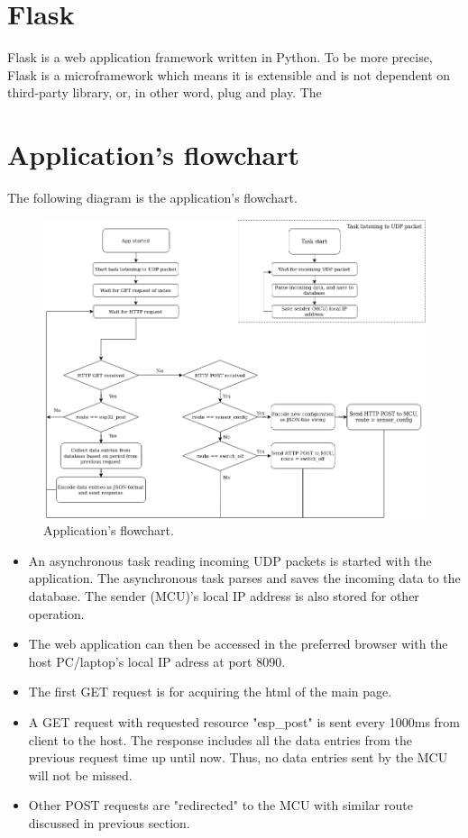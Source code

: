 \documentclass[../main.tex]{subfiles}
\begin{document}
    \section{Flask}    \label{sec:flask}
    Flask is a web application framework written in Python. To be more precise, Flask is a microframework which means it is extensible and is not dependent on third-party library, or, in other word, plug and play. The 

    \pagebreak
    \section{Application's flowchart} \label{sec:application_flowchart}
    The following diagram is the application's flowchart.
    \begin{figure}[!h]
        \centerline{\includegraphics[scale=0.5]{media/appliation_flowchart.drawio.png}}
        \caption{Application's flowchart.}
        \label{fig:application_flowchart}
    \end{figure}

    \justify
    \begin{itemize} 
        \item An asynchronous task reading incoming UDP packets is started with the application. The asynchronous task parses and saves the incoming data to the database. The sender (MCU)'s local IP address is also stored for other operation.
        \item The web application can then be accessed in the preferred browser with the host PC/laptop's local IP adress at port 8090.
        \item The first GET request is for acquiring the html of the main page.
        \item A GET request with requested resource "esp\_post" is sent every 1000ms from client to the host. The response includes all the data entries from the previous request time up until now. Thus, no data entries sent by the MCU will not be missed.
        \item Other POST requests are "redirected" to the MCU with similar route discussed in previous section.
    \end{itemize}
\end{document}

